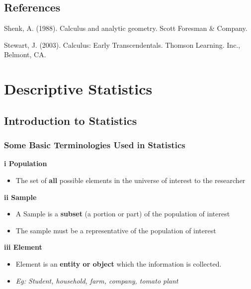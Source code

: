 \documentclass[]{book}
\providecommand{\tightlist}{%
  \setlength{\itemsep}{0pt}\setlength{\parskip}{0pt}}
\begin{document}
\hypertarget{references-3}{%
\section*{References}\label{references-3}}

Shenk, A. (1988). Calculus and analytic geometry. Scott Foresman \& Company.

Stewart, J. (2003). Calculus: Early Transcendentals. Thomson Learning. Inc., Belmont, CA.

\hypertarget{descriptive-statistics}{%
\chapter{Descriptive Statistics}\label{descriptive-statistics}}


\hypertarget{introduction-to-statistics}{%
\section{Introduction to Statistics}\label{introduction-to-statistics}}

\hypertarget{some-basic-terminologies-used-in-statistics}{%
\subsection{Some Basic Terminologies Used in Statistics}\label{some-basic-terminologies-used-in-statistics}}

\textbf{i Population}

\begin{itemize}
\tightlist
\item
  The set of \textbf{all} possible elements in the universe of interest to the researcher
\end{itemize}

\textbf{ii Sample}

\begin{itemize}
\tightlist
\item
  A Sample is a \textbf{subset} (a portion or part) of the population of interest
\item
  The sample must be a representative of the population of interest
\end{itemize}

\textbf{iii Element}

\begin{itemize}
\tightlist
\item
  Element is an \textbf{entity or object} which the information is collected.
\item
  \emph{Eg: Student, household, farm, company, tomato plant}
\end{itemize}
\end{document}
